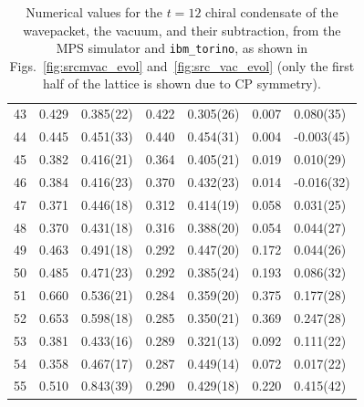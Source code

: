 \documentclass[aps, prc, tightenlines,superscriptaddress, letterpaper, amsmath, amssymb, preprintnumbers, floatfix, longbibliography, nofootinbib]{revtex4-2}
\begin{document}
\begin{table}[!htb]
{\begin{tabularx}{\textwidth}{| c || Y | Y | Y | Y | Y | Y |}
43	&	0.429	&	0.385(22)	&	0.422	&	0.305(26)	&	0.007	&	0.080(35)	\\
44	&	0.445	&	0.451(33)	&	0.440	&	0.454(31)	&	0.004	&	-0.003(45)	\\
45	&	0.382	&	0.416(21)	&	0.364	&	0.405(21)	&	0.019	&	0.010(29)	\\
46	&	0.384	&	0.416(23)	&	0.370	&	0.432(23)	&	0.014	&	-0.016(32)	\\
47	&	0.371	&	0.446(18)	&	0.312	&	0.414(19)	&	0.058	&	0.031(25)	\\
48	&	0.370	&	0.431(18)	&	0.316	&	0.388(20)	&	0.054	&	0.044(27)	\\
49	&	0.463	&	0.491(18)	&	0.292	&	0.447(20)	&	0.172	&	0.044(26)	\\
50	&	0.485	&	0.471(23)	&	0.292	&	0.385(24)	&	0.193	&	0.086(32)	\\
51	&	0.660	&	0.536(21)	&	0.284	&	0.359(20)	&	0.375	&	0.177(28)	\\
52	&	0.653	&	0.598(18)	&	0.285	&	0.350(21)	&	0.369	&	0.247(28)	\\
53	&	0.381	&	0.433(16)	&	0.289	&	0.321(13)	&	0.092	&	0.111(22)	\\
54	&	0.358	&	0.467(17)	&	0.287	&	0.449(14)	&	0.072	&	0.017(22)	\\
55	&	0.510	&	0.843(39)	&	0.290	&	0.429(18)	&	0.220	&	0.415(42)	\\ \hline
\end{tabularx}}
\caption{Numerical values for the $t=12$ chiral condensate of the wavepacket, the vacuum, and their subtraction, from the MPS simulator and {\tt ibm\_torino}, as shown in Figs.~\ref{fig:srcmvac_evol} and~\ref{fig:src_vac_evol} (only the first half of the lattice is shown due to CP symmetry).}
 \label{tab:tablet12}
\end{table}
%
\end{document}
